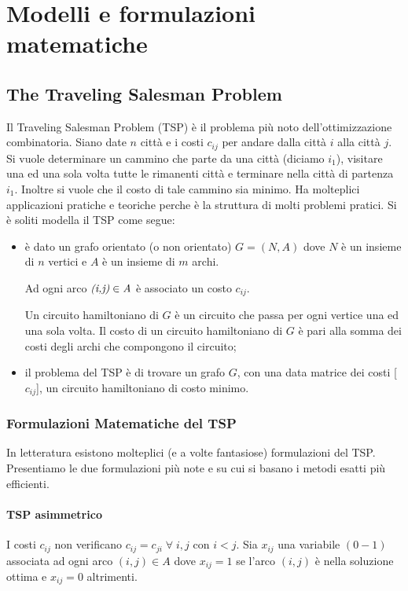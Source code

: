 \chapter{Modelli e formulazioni matematiche}

\section{The Traveling Salesman Problem}
Il Traveling Salesman Problem (TSP) è il problema più noto dell'ottimizzazione combinatoria.
Siano date $n$ città e i costi $c_{ij}$ per andare dalla città $i$ alla città $j$.
Si vuole determinare un cammino che parte da una città (diciamo $i_{1}$), visitare una ed una sola volta tutte le rimanenti città e terminare nella città di partenza $i_{1}$.
Inoltre si vuole che il costo di tale cammino sia minimo.\newline
Ha molteplici applicazioni pratiche e teoriche perche è la struttura di molti problemi pratici.\newline
Si è soliti modella il TSP come segue:
\begin{itemize}
	\item è dato un grafo orientato (o non orientato) $G = (N,A)$
	dove $N$ è un insieme di $n$ vertici e $A$ è un insieme di $m$ archi.
	
	Ad ogni arco $\emph{(i,j)} \in \emph{A}$ è associato un costo $c_{ij}$.
	
	Un circuito hamiltoniano di $G$ è un circuito che passa per ogni vertice una ed una sola volta.\newline
	Il costo di un circuito hamiltoniano di $G$ è pari alla somma dei costi degli archi che compongono il circuito;
	\item il problema del TSP è di trovare un grafo $G$, con una data matrice dei costi [$c_{ij}$], un circuito hamiltoniano di costo minimo.
\end{itemize}
\newpage
\subsection{Formulazioni Matematiche del TSP}
In letteratura esistono molteplici (e a volte fantasiose) formulazioni del TSP.\newline
Presentiamo le due formulazioni più note e su cui si basano i metodi esatti più efficienti.

\subsubsection{TSP asimmetrico}
I costi $c_{ij}$ non verificano $c_{ij} = c_{ji}\;\forall\;i,j$ con $i < j$.\newline
Sia $x_{ij}$ una variabile $(0-1)$ associata ad ogni arco $(i,j) \in A$ dove $x_{ij}=1$ se l'arco $(i,j)$ è nella soluzione ottima e $x_{ij}=0$ altrimenti.\newline

